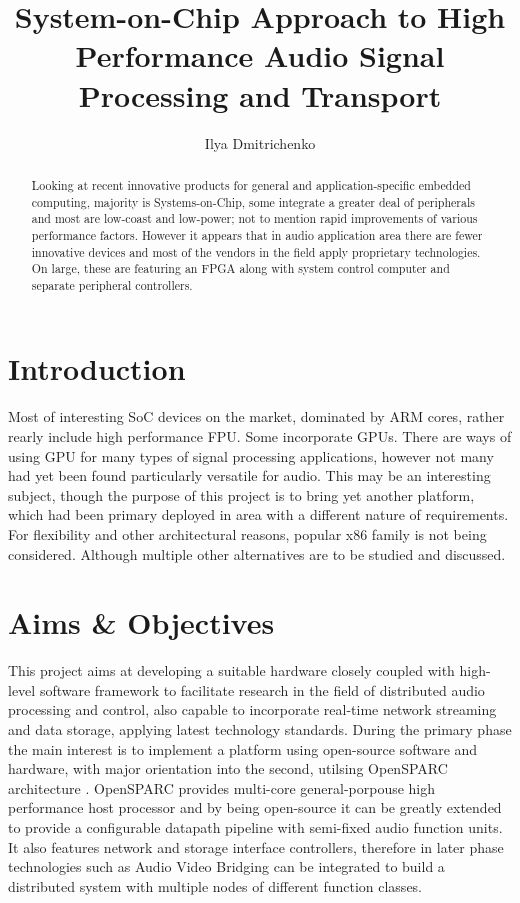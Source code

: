 \documentclass[twocolumn]{article}
\title{ System-on-Chip Approach to High Performance
	Audio Signal Processing and Transport }
\author{ Ilya Dmitrichenko }
\begin{document}
\maketitle

\begin{abstract}
\em

 Looking at recent innovative products for general and
 application-specific embedded computing, majority is
 Systems-on-Chip, some integrate a greater deal of peripherals
 and most are low-coast and low-power; not to mention rapid
 improvements of various performance factors.
  However it appears that in audio application area there
 are fewer innovative devices and most of the vendors in the
 field apply proprietary technologies. On large, these are
 featuring an FPGA along with system control computer and
 separate peripheral controllers.

\end{abstract}

\section{Introduction}

  Most of interesting SoC devices on the market, dominated by
 ARM cores, rather rearly include high performance FPU. Some
 incorporate GPUs. There are ways of using GPU for many types
 of signal processing applications, however not many had yet
 been found particularly versatile for audio. This may be an
 interesting subject, though the purpose of this project is
 to bring yet another platform, which had been primary deployed
 in area with a different nature of requirements.
  For flexibility and other architectural reasons, popular
 x86 family is not being considered. Although multiple other
 alternatives are to be studied and discussed.



\section{Aims \& Objectives}

  This project aims at developing a suitable hardware closely coupled
  with high-level software framework to facilitate research in the field
  of distributed audio processing and control, also capable to incorporate 
  real-time network streaming and data storage, applying latest technology
  standards.
  During the primary phase the main interest is to implement a platform
  using open-source software and hardware, with major orientation into
  the second, utilsing OpenSPARC architecture \cite{book:opensparc,
  page:opensparc:docs,page:opensparc:S1}.
  OpenSPARC provides multi-core general-porpouse high performance host
  processor and by being open-source it can be greatly extended to provide 
  a configurable datapath pipeline with semi-fixed audio function units.
  It also features network and storage interface controllers, therefore in
  later phase technologies such as Audio Video Bridging \cite{page:avb,
  wiki:avb} can be integrated to build a distributed system with multiple
  nodes of different function classes. 
  
\end{document}
